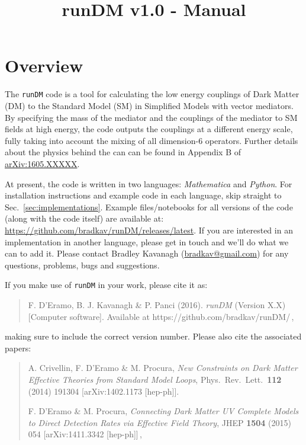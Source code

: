 \documentclass[notitlepage,12pt]{article}
\newcommand{\runDM}{\texttt{runDM}\xspace}
\begin{document}
\title{runDM v1.0 - Manual}
\maketitle

\tableofcontents

\section{Overview}

The \runDM code is a tool for calculating the low energy couplings of Dark Matter (DM) to the Standard Model (SM) in Simplified Models with vector mediators. By specifying the mass of the mediator and the couplings of the mediator to SM fields at high energy, the code outputs the couplings at a different energy scale, fully taking into account the mixing of all dimension-6 operators. Further details about the physics behind the can can be found in Appendix B of \href{http://arxiv.org/abs/1605.XXXXX}{arXiv:1605.XXXXX}.

At present, the code is written in two languages: \textit{Mathematica} and \textit{Python}. For installation instructions and example code in each language, skip straight to Sec.~\ref{sec:implementations}. Example files/notebooks for all versions of the code (along with the code itself) are available at: \href{https://github.com/bradkav/runDM/releases/latest}{https://github.com/bradkav/runDM/releases/latest}. If you are interested in an implementation in another language, please get in touch and we'll do what we can to add it. Please contact Bradley Kavanagh (\href{mailto:bradkav@gmail.com?subject=runDM v.10}{bradkav@gmail.com}) for any questions, problems, bugs and suggestions.

If you make use of \runDM in your work, please cite it as:

\begin{quote}
F. D'Eramo, B. J. Kavanagh \& P. Panci (2016). \textit{runDM} (Version X.X) [Computer software]. Available at https://github.com/bradkav/runDM/\,,
\end{quote}
making sure to include the correct version number. Please also cite the associated papers:

\begin{quote}

 A. Crivellin, F. D'Eramo \& M. Procura, \textit{New Constraints on Dark Matter Effective Theories from Standard Model Loops}, Phys.\ Rev.\ Lett.\  {\bf 112} (2014) 191304 [arXiv:1402.1173 [hep-ph]].

F. D'Eramo \& M. Procura, \textit{Connecting Dark Matter UV Complete Models to Direct Detection Rates via Effective Field Theory}, JHEP {\bf 1504} (2015) 054 [arXiv:1411.3342 [hep-ph]]\,,
\end{quote}
\end{document}
